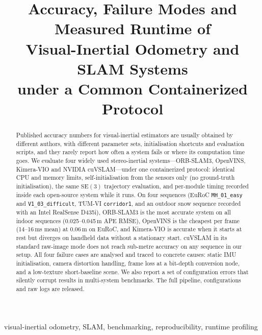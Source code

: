 \documentclass[conference,a4paper]{IEEEtran}
\newcommand{\ds}[1]{\texttt{#1}}
\newcommand{\MHe}{\ds{MH\_01\_easy}}
\newcommand{\VId}{\ds{V1\_03\_difficult}}
\newcommand{\corr}{\ds{corridor1}}
\newcommand{\SE}{$\mathrm{SE}(3)$}
\begin{document}
\title{Accuracy, Failure Modes and Measured Runtime of\\
Visual-Inertial Odometry and SLAM Systems\\
under a Common Containerized Protocol}

\author{
}

\maketitle

\begin{abstract}
Published accuracy numbers for visual-inertial estimators are usually obtained by different
authors, with different parameter sets, initialisation shortcuts and evaluation scripts, and
they rarely report how often a system fails or where its computation time goes. We evaluate
four widely used stereo-inertial systems---ORB-SLAM3, OpenVINS, Kimera-VIO and NVIDIA
cuVSLAM---under one containerized protocol: identical CPU and memory limits, self-initialisation
from the sensors only (no ground-truth initialisation), the same \SE{} trajectory evaluation,
and per-module timing recorded inside each open-source system while it runs. On four sequences
(EuRoC \MHe{} and \VId{}, TUM-VI \corr{}, and an outdoor snow sequence recorded with an Intel
RealSense D435i), ORB-SLAM3 is the most accurate system on all indoor sequences
(0.025--0.045\,m APE RMSE), OpenVINS is the cheapest per frame (14--16\,ms mean) at
0.06\,m on EuRoC, and Kimera-VIO is accurate when it starts at rest but diverges on handheld
data without a stationary start. cuVSLAM in its standard raw-image mode does not reach
sub-metre accuracy on any sequence in our setup. All four failure cases are analysed and traced
to concrete causes: static IMU initialisation, camera distortion handling, frame loss at a
bit-depth conversion node, and a low-texture short-baseline scene. We also report a set of
configuration errors that silently corrupt results in multi-system benchmarks. The full
pipeline, configurations and raw logs are released.
\end{abstract}

\begin{IEEEkeywords}
visual-inertial odometry, SLAM, benchmarking, reproducibility, runtime profiling
\end{IEEEkeywords}

\end{document}
